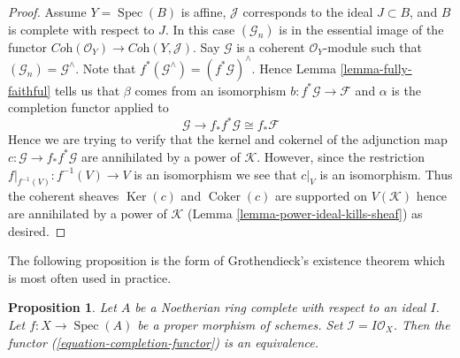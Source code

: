 \documentclass[10pt,a4paper]{amsart}
\theoremstyle{plain}
\newtheorem{proposition}[subsection]{Proposition}
\theoremstyle{definition}
\theoremstyle{remark}
\numberwithin{equation}{subsection}
\def\Spec{\mathop{\mathrm{Spec}}}
\def\Ker{\mathop{\mathrm{Ker}}}
\def\Coker{\mathop{\mathrm{Coker}}}
\begin{document}
\begin{proof}
\medskip\noindent
Assume $Y = \Spec(B)$ is affine, $\mathcal{J}$ corresponds to the ideal
$J \subset B$, and $B$ is complete with respect to $J$.
In this case $(\mathcal{G}_n)$ is in the essential image of the functor
$\textit{Coh}(\mathcal{O}_Y) \to \textit{Coh}(Y, \mathcal{J})$.
Say $\mathcal{G}$ is a coherent $\mathcal{O}_Y$-module such that
$(\mathcal{G}_n) = \mathcal{G}^\wedge$. Note that
$f^*(\mathcal{G}^\wedge) = (f^*\mathcal{G})^\wedge$. Hence
Lemma \ref{lemma-fully-faithful}
tells us that $\beta$ comes from an isomorphism
$b : f^*\mathcal{G} \to \mathcal{F}$
and $\alpha$ is the completion functor applied to
$$
\mathcal{G} \to f_*f^*\mathcal{G} \cong f_*\mathcal{F}
$$
Hence we are trying to verify that the kernel and cokernel of the
adjunction map $c : \mathcal{G} \to f_*f^*\mathcal{G}$ are annihilated by
a power of $\mathcal{K}$. However, since the restriction
$f|_{f^{-1}(V)} : f^{-1}(V) \to V$ is an isomorphism
we see that $c|_V$ is an isomorphism. Thus the coherent sheaves
$\Ker(c)$ and $\Coker(c)$ are supported on $V(\mathcal{K})$
hence are annihilated by a power of $\mathcal{K}$
(Lemma \ref{lemma-power-ideal-kills-sheaf}) as desired.
\end{proof}

\noindent
The following proposition is the form of Grothendieck's existence
theorem which is most often used in practice.

\begin{proposition}
\label{proposition-existence-proper}
Let $A$ be a Noetherian ring complete with respect to an ideal $I$.
Let $f : X \to \Spec(A)$ be a proper morphism of schemes.
Set $\mathcal{I} = I\mathcal{O}_X$.
Then the functor (\ref{equation-completion-functor}) is an equivalence.
\end{proposition}
\end{document}
